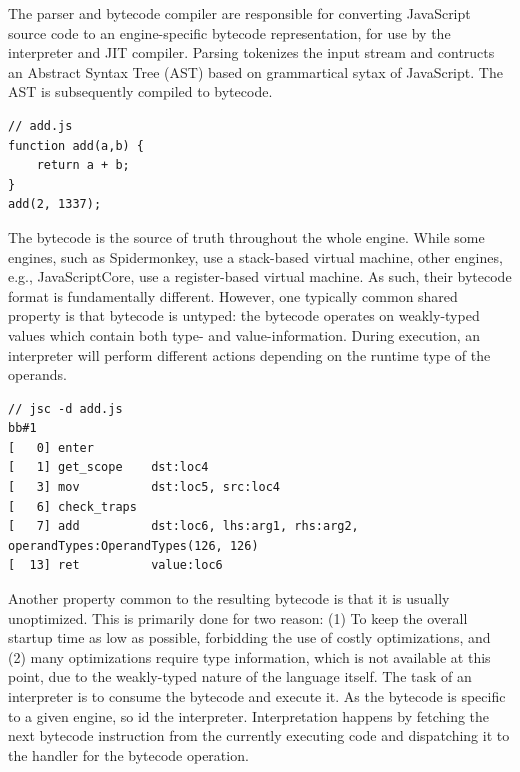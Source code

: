 %
The parser and bytecode compiler are responsible for converting JavaScript source
code to an engine-specific bytecode representation, for use by the interpreter and JIT
compiler. Parsing tokenizes the input stream and contructs an Abstract Syntax Tree (AST)
based on grammartical sytax of JavaScript. The AST is subsequently compiled to bytecode.%
%
%
\begin{lstfloat}
\begin{lstlisting}[style=JS,caption=Example function to JIT compiler]
// add.js
function add(a,b) {
    return a + b;
}
add(2, 1337);
\end{lstlisting}
\end{lstfloat}
%
\vspace{-1.5em}\noindent
The bytecode is the source of truth throughout the whole engine. While some engines, such as
Spidermonkey, use a stack-based virtual machine, other engines, e.g., JavaScriptCore, use a register-based
virtual machine. As such, their bytecode format is fundamentally different. However, one typically common
shared property is that bytecode is untyped: the bytecode operates on weakly-typed values which
contain both type- and value-information. During execution, an interpreter will perform
different actions depending on the runtime type of the operands.
%
\begin{lstfloat}
\begin{lstlisting}[style=asm, caption=Interpreter bytecode and type profile]
// jsc -d add.js
bb#1
[   0] enter
[   1] get_scope    dst:loc4
[   3] mov          dst:loc5, src:loc4
[   6] check_traps
[   7] add          dst:loc6, lhs:arg1, rhs:arg2, operandTypes:OperandTypes(126, 126)
[  13] ret          value:loc6
\end{lstlisting}
\end{lstfloat}
%
\vspace{-1.5em}\noindent
Another property common to the resulting bytecode is that it is usually unoptimized. This is primarily done
for two reason: (1) To keep the overall startup time as low as possible, forbidding the use of costly
optimizations, and (2) many optimizations require type information, which is not available at this point,
due to the weakly-typed nature of the language itself.
%
%
The task of an interpreter is to consume the bytecode and execute it. As the bytecode is specific to
a given engine, so id the interpreter. Interpretation happens by fetching the next bytecode instruction
from the currently executing code and dispatching it to the handler for the bytecode operation.

